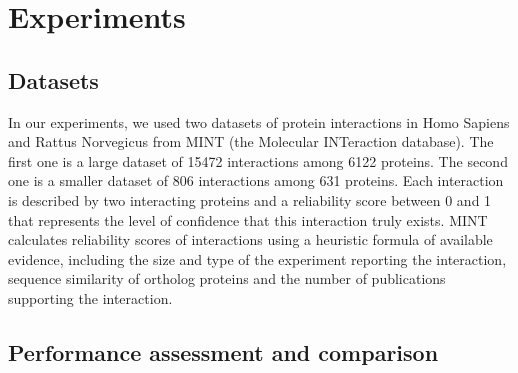 \documentclass{ws-procs11x85}
\begin{document}
\section{Experiments}

\subsection{Datasets}
In our experiments, we used two datasets of protein interactions
in Homo Sapiens and Rattus Norvegicus from MINT\cite{mint1} (the Molecular
INTeraction database). The first one is a large dataset of 15472 interactions
among 6122 proteins. The second one is a smaller dataset of 806 interactions
among 631 proteins. Each interaction is described by two interacting proteins and a
reliability score between 0 and 1 that represents the level of confidence that
this interaction truly exists. MINT calculates reliability scores of
interactions using a heuristic formula of available evidence, including the
size and type of the experiment reporting the interaction, sequence similarity
of ortholog proteins and the number of publications supporting the
interaction\cite{mint2}.

\subsection{Performance assessment and comparison}
\end{document}
